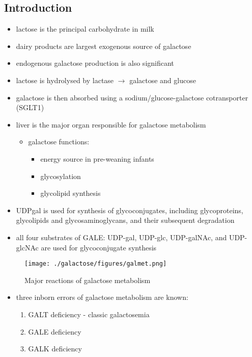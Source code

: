 \documentclass{scrartcl}
\begin{document}
\subsection{Introduction}
\label{sec:org2c856a7}
\begin{itemize}
\item lactose is the principal carbohydrate in milk
\item dairy products are largest exogenous source of galactose
\item endogenous galactose production is also significant
\item lactose is hydrolysed by lactase \(\to\) galactose and glucose
\item galactose is then absorbed using a sodium/glucose-galactose cotransporter (SGLT1)
\item liver is the major organ responsible for galactose metabolism
\begin{itemize}
\item galactose functions:
\begin{itemize}
\item energy source in pre-weaning infants
\item glycosylation
\item glycolipid synthesis
\end{itemize}
\end{itemize}

\item UDPgal is used for synthesis of glycoconjugates, including
glycoproteins, glycolipids and glycosaminoglycans, and their
subsequent degradation
\item all four substrates of GALE: UDP-gal, UDP-glc, UDP-galNAc, and
UDP-glcNAc are used for glycoconjugate synthesis
\end{itemize}

\begin{figure}[htbp]
\centering
\texttt{[image: ./galactose/figures/galmet.png]}
\caption{\label{fig:org8b90638}
Major reactions of galactose metabolism}
\end{figure}

\begin{itemize}
\item three inborn errors of galactose metabolism are known:
\begin{enumerate}
\item GALT deficiency - classic galactosemia
\item GALE deficiency
\item GALK deficiency
\end{enumerate}
\end{itemize}
\end{document}
